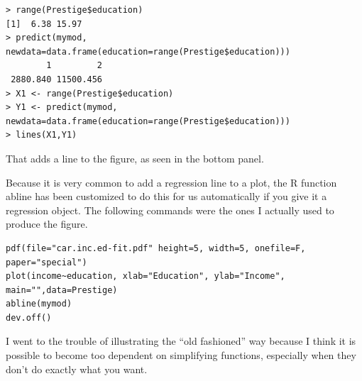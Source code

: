 \begin{lstlisting}
> range(Prestige$education)
[1]  6.38 15.97
> predict(mymod, newdata=data.frame(education=range(Prestige$education)))
        1         2 
 2880.840 11500.456 
> X1 <- range(Prestige$education)
> Y1 <- predict(mymod, newdata=data.frame(education=range(Prestige$education)))
> lines(X1,Y1)
\end{lstlisting}

That adds a line to the figure, as seen in the bottom panel.

Because it is very common to add a regression line to a plot, the
R function abline has been customized to do this for us automatically
if you give it a regression object. The following commands were the
ones I actually used to produce the figure. 

\begin{lstlisting}[breaklines=true]
pdf(file="car.inc.ed-fit.pdf" height=5, width=5, onefile=F, paper="special")
plot(income~education, xlab="Education", ylab="Income", main="",data=Prestige)
abline(mymod)
dev.off()
\end{lstlisting}

I went to the trouble of illustrating the ``old fashioned'' way
because I think it is possible to become too dependent on simplifying
functions, especially when they don't do exactly what you want.

